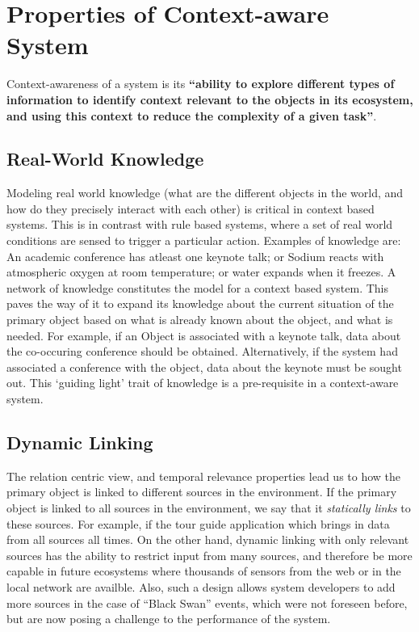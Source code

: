 \section{Properties of Context-aware System}

Context-awareness of a system is its \textbf{``ability to explore different types of information to identify context relevant to the objects in its ecosystem, and using this context to reduce the complexity of a given task''}. 

\subsection{Real-World Knowledge}
Modeling real world knowledge (what are the different objects in the world, and how do they precisely interact with each other) is critical in context based systems. This is in contrast with rule based systems, where a set of real world conditions are sensed to trigger a particular action. Examples of knowledge are: An academic conference has atleast one keynote talk; or Sodium reacts with atmospheric oxygen at room temperature; or water expands when it freezes. A network of knowledge constitutes the model for a context based system. This paves the way of it to expand its knowledge about the current situation of the primary object based on what is already known about the object, and what is needed. For example, if an Object is associated with a keynote talk, data about the co-occuring conference should be obtained. Alternatively, if the system had associated a conference with the object, data about the keynote must be sought out. This `guiding light' trait of knowledge is a pre-requisite in a context-aware system.

\subsection{Dynamic Linking}
The relation centric view, and temporal relevance properties lead us to how the primary object is linked to different sources in the environment. If the primary object is linked to all sources in the environment, we say that it \textit{statically links} to these sources. For example, if the tour guide application which brings in data from all sources all times. On the other hand, dynamic linking with only relevant sources has the ability to restrict input from many sources, and therefore be more capable in future ecosystems where thousands of sensors from the web or in the local network are availble. Also, such a design allows system developers to add more sources in the case of ``Black Swan'' events, which were not foreseen before, but are now posing a challenge to the performance of the system.

